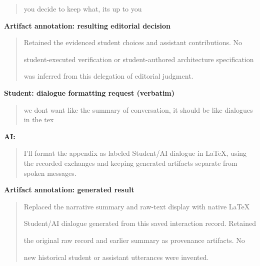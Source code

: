 \begin{quote}\small\raggedright

you decide to keep what, its up to you\par

\end{quote}

\par\medskip\noindent\textbf{Artifact annotation: resulting editorial decision}\par

\begin{quote}\small\raggedright

Retained the evidenced student choices and assistant contributions. No\par
student-executed verification or student-authored architecture specification\par
was inferred from this delegation of editorial judgment.\par

\end{quote}

\par\medskip\noindent\textbf{Student: dialogue formatting request (verbatim)}\par

\begin{quote}\small\raggedright

we dont want like the summary of conversation, it should be like dialogues in the tex\par

\end{quote}

\par\medskip\noindent\textbf{AI:}\par

\begin{quote}\small\raggedright

I'll format the appendix as labeled Student/AI dialogue in LaTeX, using the recorded exchanges and keeping generated artifacts separate from spoken messages.\par

\end{quote}

\par\medskip\noindent\textbf{Artifact annotation: generated result}\par

\begin{quote}\small\raggedright

Replaced the narrative summary and raw-text display with native LaTeX\par
Student/AI dialogue generated from this saved interaction record. Retained\par
the original raw record and earlier summary as provenance artifacts. No\par
new historical student or assistant utterances were invented.\par

\end{quote}

